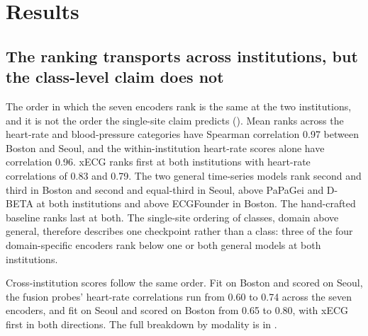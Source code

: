 \documentclass[pmlr,twocolumn,10pt]{jmlr}
\newcommand{\domainmodel}{xECG}
\begin{document}
\section{Results}
\label{sec:results}

\subsection{The ranking transports across institutions, but the class-level claim does not}
\label{sec:transport}

The order in which the seven encoders rank is the same at the two institutions, and it is not the order the single-site claim predicts (). Mean ranks across the heart-rate and blood-pressure categories have Spearman correlation 0.97 between Boston and Seoul, and the within-institution heart-rate scores alone have correlation 0.96. \domainmodel{} ranks first at both institutions with heart-rate correlations of 0.83 and 0.79. The two general time-series models rank second and third in Boston and second and equal-third in Seoul, above PaPaGei and D-BETA at both institutions and above ECGFounder in Boston. The hand-crafted baseline ranks last at both. The single-site ordering of classes, domain above general, therefore describes one checkpoint rather than a class: three of the four domain-specific encoders rank below one or both general models at both institutions.

Cross-institution scores follow the same order. Fit on Boston and scored on Seoul, the fusion probes' heart-rate correlations run from 0.60 to 0.74 across the seven encoders, and fit on Seoul and scored on Boston from 0.65 to 0.80, with \domainmodel{} first in both directions. The full breakdown by modality is in .
\end{document}
